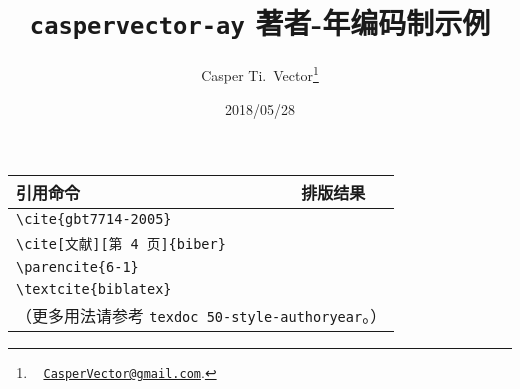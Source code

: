 \documentclass[UTF8]{ctexart}
\begin{document}
\title{\textbf{\texttt{caspervector-ay} 著者-年编码制示例}}
\author{%
	Casper Ti.\ Vector\thanks{\ %
		\href{mailto:CasperVector@gmail.com}{\texttt{CasperVector@gmail.com}}.%
	}%
}
\date{2018/05/28}
\maketitle

\begin{center}
\begin{tabular}{ll}
\hline
引用命令 &	排版结果 \\\hline
\verb|\cite{gbt7714-2005}| &	\cite{gbt7714-2005} \\
\verb|\cite[文献][第 4 页]{biber}| &	\cite[文献][第 4 页]{biber} \\
\verb|\parencite{6-1}| &	\parencite{6-1} \\
\verb|\textcite{biblatex}| &	\textcite{biblatex} \\\hline
\multicolumn{2}{l}{（更多用法请参考 \texttt{texdoc 50-style-authoryear}。）} \\
\end{tabular}
\end{center}

\printbibliography
\nocite{*}
\end{document}
